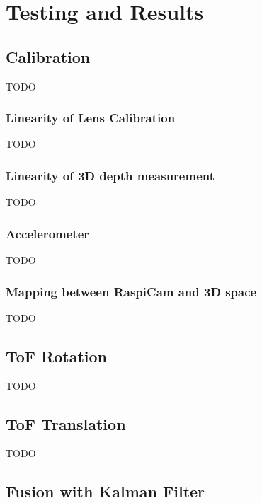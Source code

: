 \chapter{Testing and Results}
\label{sec:Results}

\section{Calibration}
TODO
\subsection{Linearity of Lens Calibration}
TODO
\subsection{Linearity of 3D depth measurement}
TODO
\subsection{Accelerometer}
TODO
\subsection{Mapping between RaspiCam and 3D space}
TODO
\section{ToF Rotation}
TODO
\section{ToF Translation}
TODO
\section{Fusion with Kalman Filter}
